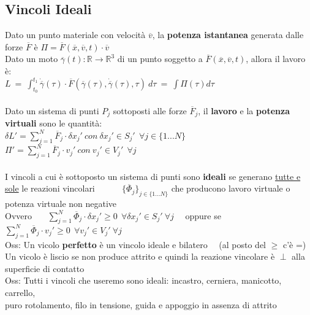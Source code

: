 \documentclass{article}
\begin{document}
\subsection{Vincoli Ideali}
%
Dato un punto materiale con velocità $\overline{v}$, la \textbf{potenza istantanea} generata dalle forze $\overline{F}$ è $\Pi=\overline{F}(\overline{x},\overline{v},t)\cdot \overline{v}$ \\
%
Dato un moto $\overline{\gamma}(t):\mathbb{R}\rightarrow\mathbb{R}^3$ di un punto soggetto a $\overline{F}(\overline{x},\overline{v},t)$, allora il lavoro è:\\
\phantom{}\hspace{2in} $L \ =\ \int^{t_1}_{t_0} \dot{\overline{\gamma}}(\tau)\cdot\overline{F}(\overline{\gamma}(\tau),\dot{\overline{\gamma}}(\tau),\tau)\ d\tau \ = \ \int\Pi(\tau)d\tau$ \\ \\
%
%
%
Dato un sistema di punti $P_j$ sottoposti alle forze $\overline{F}_j$, il \textbf{lavoro} e la \textbf{potenza virtuali} sono le quantità:\\
\phantom{\ \ \ } $\delta L'=\sum^N_{j=1}\overline{F}_j\cdot\delta x_j' \ con \ \delta x_j' \in S_j' \ \ \forall j \in \{ 1...N\}$
\ \ \ \ $\Pi'=\sum^N_{j=1}\overline{F}_j\cdot v_j' \ con \ v_j' \in V_j' \ \ \forall j$ \\ \\
%
%
%
I vincoli a cui è sottoposto un sistema di punti sono \textbf{ideali} se generano \underline{tutte e sole} le reazioni vincolari \ \ \ \ \
\phantom{\ \ \ } $\{\overline{\Phi}_j\}_{j\in\{1...N\}}$ che producono lavoro virtuale o potenza virtuale non negative \\
\phantom{\ \ \ } Ovvero \ \ \ $\sum^N_{j=1}\overline{\Phi}_j\cdot\delta x_j'\geq 0 \ \ \forall \delta x_j' \in S_j' \ \forall j$ \ \ oppure se \ \ \ $\sum^N_{j=1}\overline{\Phi}_j\cdot v_j'\geq 0 \ \ \forall v_j' \in V_j' \ \forall j$ \\
Oss: Un vicolo \textbf{perfetto} è un vincolo ideale e bilatero \ \ (al posto del $\geq$ c'è =)\\
\phantom{Oss: }Un vicolo è liscio se non produce attrito e quindi la reazione vincolare è $\perp$ alla superficie di contatto \\
Oss: Tutti i vincoli che useremo sono ideali: incastro, cerniera, manicotto, carrello, \\
\phantom{Oss: }puro rotolamento, filo in tensione, guida e appoggio in assenza di attrito \\ \\
\end{document}
